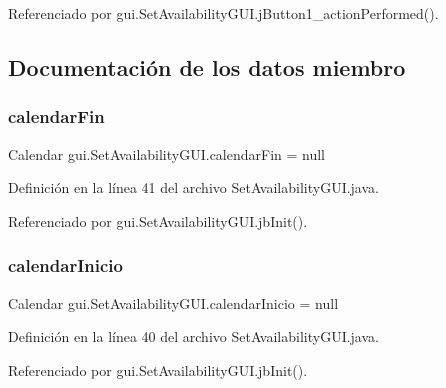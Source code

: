 Referenciado por gui.\+Set\+Availability\+G\+U\+I.\+j\+Button1\+\_\+action\+Performed().



\subsection{Documentación de los datos miembro}
\mbox{\label{classgui_1_1_set_availability_g_u_i_a5e2c23ae26a24b06dc19e8b2c9233807}} 
\subsubsection{\texorpdfstring{calendarFin}{calendarFin}}
{\footnotesize\ttfamily Calendar gui.\+Set\+Availability\+G\+U\+I.\+calendar\+Fin = null\hspace{0.3cm}{\ttfamily [private]}}



Definición en la línea 41 del archivo Set\+Availability\+G\+U\+I.\+java.



Referenciado por gui.\+Set\+Availability\+G\+U\+I.\+jb\+Init().

\mbox{\label{classgui_1_1_set_availability_g_u_i_a51ab1c21f362c9f5c76028af1378b45a}} 
\subsubsection{\texorpdfstring{calendarInicio}{calendarInicio}}
{\footnotesize\ttfamily Calendar gui.\+Set\+Availability\+G\+U\+I.\+calendar\+Inicio = null\hspace{0.3cm}{\ttfamily [private]}}



Definición en la línea 40 del archivo Set\+Availability\+G\+U\+I.\+java.



Referenciado por gui.\+Set\+Availability\+G\+U\+I.\+jb\+Init().

\mbox{\label{classgui_1_1_set_availability_g_u_i_af95034b6b6816249cfe637bd01f40738}} 
